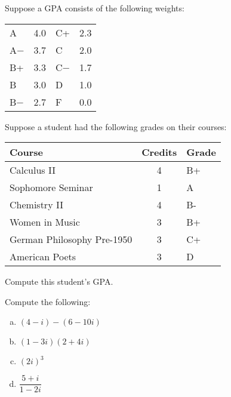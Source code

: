 \documentclass[11pt,letterpaper]{article}
\begin{document}
 Suppose a GPA consists of the following weights:
	\begin{table}[!ht]
	\centering
	\begin{tabular}{lr|lr}
	A & 4.0 & C+ & 2.3 \\
	A$-$ & 3.7 & C & 2.0 \\
	B+ & 3.3 & C$-$ & 1.7 \\
	B & 3.0 & D & 1.0 \\
	B$-$ & 2.7 & F & 0.0
	\end{tabular}
	\end{table} \par
Suppose a student had the following grades on their courses:
	\begin{table}[!ht]
	\centering
	\begin{tabular}{lcl}
	Course & Credits & Grade \\ \hline
	Calculus II & 4 & B+ \\
	Sophomore Seminar & 1 & A \\
	Chemistry II & 4 & B- \\
	Women in Music & 3 & B+ \\
	German Philosophy Pre-1950 & 3 & C+ \\
	American Poets & 3 & D
	\end{tabular}
	\end{table}
Compute this student's GPA. 



\newpage



 Compute the following:
	\begin{enumerate}[(a)]
	\item $(4 - i) - (6 - 10i)$
	\item $(1 - 3i)(2 + 4i)$
	\item $(2i)^3$
	\item $\dfrac{5 + i}{1 - 2i}$
	\end{enumerate} 
\end{document}
